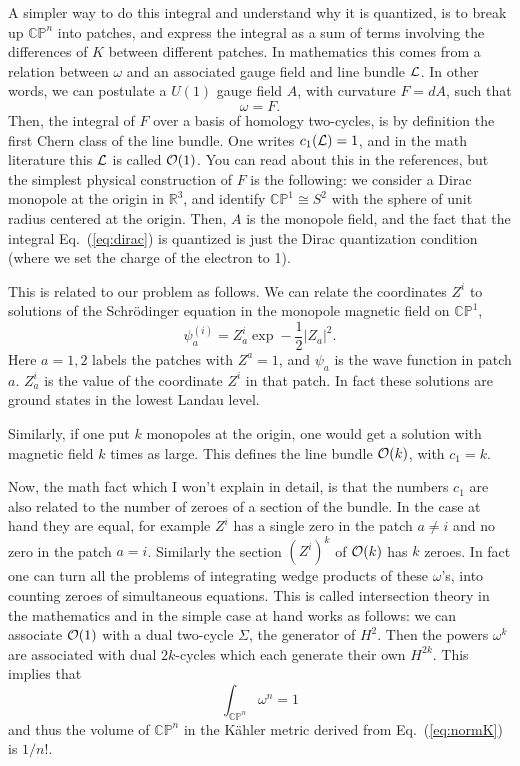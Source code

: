 \documentclass[12pt]{article}
\def\IC{\mathbb{C}}
\def\IR{\mathbb{R}}
\def\IP{\mathbb{P}}
\def\CL {{\cal L}}
\def\CO {{\cal O}}
\def\half{\frac{1}{2}}
\newcommand{\eq}[1]{Eq.~(\ref{eq:#1})}
\newcommand{\be}{\begin{equation}}
\newcommand{\ee}{\end{equation}}
\begin{document}
A simpler way to do this integral and understand why it is quantized, is to break up $\IC\IP^n$
into patches, and express the integral as a sum of terms involving the differences of $K$ between
different patches.  In mathematics this comes from a relation between $\omega$ and an associated
gauge field and line bundle $\CL$.  In other words, we can postulate a $U(1)$ gauge field $A$, with
curvature $F=dA$, such that
\be
\omega = F .
\ee 
Then, the integral of $F$ over a basis of homology two-cycles, is by definition the first Chern class
of the line bundle.  One writes $c_1(\CL)=1$, and in the math literature this $\CL$ is called $\CO(1)$.
You can read about this in the references, but the simplest physical construction
of $F$ is the following: we consider a Dirac monopole at the origin in $\IR^3$, and identify $\IC\IP^1\cong S^2$
with the sphere of unit radius centered at the origin.  Then, $A$ is the monopole field, and the fact
that the integral \eq{dirac} is quantized is just the Dirac quantization condition (where we set the charge
of the electron to 1).

This is related to our problem as follows.  We can relate the coordinates $Z^i$ to solutions of the
Schr\"odinger equation in the monopole magnetic field on $\IC\IP^1$,
\be
\psi_a^{(i)} = Z_a^i \exp -\half |Z_a|^2 .
\ee
Here $a=1,2$ labels the patches with $Z^a=1$, and $\psi_a$ is the wave function in patch $a$.
$Z^i_a$ is the value of the coordinate $Z^i$ in that patch.
In fact these solutions are ground states in the lowest Landau level.

Similarly, if one put $k$ monopoles at the origin, one would get a solution with magnetic field $k$
times as large.  This defines the line bundle $\CO(k)$, with $c_1=k$.

Now, the math fact which I won't explain in detail, is that the numbers $c_1$ are also related to the
number of zeroes of a section of the bundle.  In the case at hand they are equal, for example $Z^i$ has a single
zero in the patch $a\ne i$ and no zero in the patch $a=i$.  Similarly the section $(Z^i)^k$ of $\CO(k)$ has
$k$ zeroes.  In fact one can turn all the problems of integrating wedge products of these $\omega$'s,
into counting zeroes of simultaneous equations.  This is called intersection theory in the mathematics and
in the simple case at hand works as follows: we can associate $\CO(1)$ with a dual two-cycle $\Sigma$,
the generator of $H^2$.  Then the powers $\omega^k$ are associated with dual $2k$-cycles which each
generate their own $H^{2k}$.  This implies that
\be
\int_{\IC\IP^n} \omega^n = 1 
\ee
and thus the volume of $\IC\IP^n$ in the K\"ahler metric derived from \eq{normK} is $1/n!$.
\end{document}
